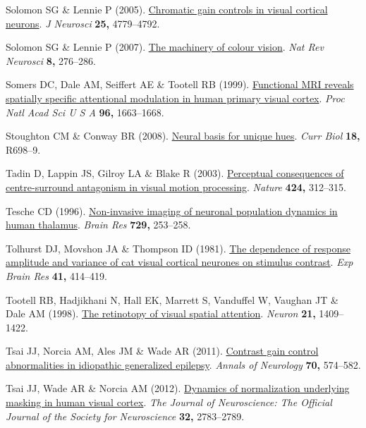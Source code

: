 \documentclass[
  letterpaper,
  DIV=11,
  numbers=noendperiod]{scrartcl}
\newlength{\cslhangindent}
\newenvironment{CSLReferences}[2] %
 {\begin{list}{}{%
  \setlength{\itemindent}{0pt}
  \setlength{\leftmargin}{0pt}
  \setlength{\parsep}{0pt}
  \ifodd #1
   \setlength{\leftmargin}{\cslhangindent}
   \setlength{\itemindent}{-1\cslhangindent}
  \fi
  \setlength{\itemsep}{#2\baselineskip}}}
 {\end{list}}
\begin{document}
\begin{CSLReferences}{1}{1}
Solomon SG \& Lennie P (2005).
\href{https://doi.org/10.1523/JNEUROSCI.5316-04.2005}{Chromatic gain
controls in visual cortical neurons}. \emph{J Neurosci} \textbf{25,}
4779--4792.

Solomon SG \& Lennie P (2007).
\href{https://doi.org/10.1038/nrn2094}{The machinery of colour vision}.
\emph{Nat Rev Neurosci} \textbf{8,} 276--286.

Somers DC, Dale AM, Seiffert AE \& Tootell RB (1999).
\href{https://doi.org/10.1073/pnas.96.4.1663}{Functional MRI reveals
spatially specific attentional modulation in human primary visual
cortex}. \emph{Proc Natl Acad Sci U S A} \textbf{96,} 1663--1668.

Stoughton CM \& Conway BR (2008).
\href{https://doi.org/10.1016/j.cub.2008.06.018}{Neural basis for unique
hues}. \emph{Curr Biol} \textbf{18,} R698--9.

Tadin D, Lappin JS, Gilroy LA \& Blake R (2003).
\href{https://doi.org/10.1038/nature01800}{Perceptual consequences of
centre-surround antagonism in visual motion processing}. \emph{Nature}
\textbf{424,} 312--315.

Tesche CD (1996).
\href{https://www.ncbi.nlm.nih.gov/pubmed/8876995}{Non-invasive imaging
of neuronal population dynamics in human thalamus}. \emph{Brain Res}
\textbf{729,} 253--258.

Tolhurst DJ, Movshon JA \& Thompson ID (1981).
\href{https://doi.org/10.1007/BF00238900}{The dependence of response
amplitude and variance of cat visual cortical neurones on stimulus
contrast}. \emph{Exp Brain Res} \textbf{41,} 414--419.

Tootell RB, Hadjikhani N, Hall EK, Marrett S, Vanduffel W, Vaughan JT \&
Dale AM (1998). \href{https://doi.org/10.1016/s0896-6273(00)80659-5}{The
retinotopy of visual spatial attention}. \emph{Neuron} \textbf{21,}
1409--1422.

Tsai JJ, Norcia AM, Ales JM \& Wade AR (2011).
\href{https://doi.org/10.1002/ana.22462}{Contrast gain control
abnormalities in idiopathic generalized epilepsy}. \emph{Annals of
Neurology} \textbf{70,} 574--582.

Tsai JJ, Wade AR \& Norcia AM (2012).
\href{https://doi.org/10.1523/JNEUROSCI.4485-11.2012}{Dynamics of
normalization underlying masking in human visual cortex}. \emph{The
Journal of Neuroscience: The Official Journal of the Society for
Neuroscience} \textbf{32,} 2783--2789.


\end{CSLReferences}
\end{document}
